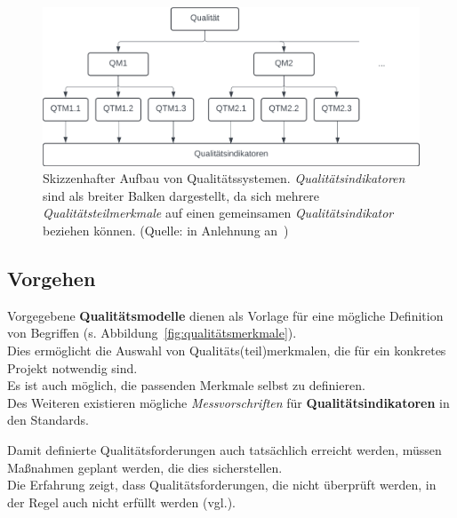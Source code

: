 \begin{figure}
    \centering
    \includegraphics[scale=0.8]{part four/Qualität/img/qualitätssysteme}
    \caption{Skizzenhafter Aufbau von Qualitätssystemen. \textit{Qualitätsindikatoren} sind als breiter Balken dargestellt, da sich mehrere \textit{Qualitätsteilmerkmale} auf einen gemeinsamen \textit{Qualitätsindikator} beziehen können. (Quelle: in Anlehnung an~\cite[Abb. 1.1, 3]{Wed09c})}
    \label{fig:qualitätssysteme}
\end{figure}


\subsection*{Vorgehen}
Vorgegebene \textbf{Qualitätsmodelle} dienen als Vorlage für eine mögliche Definition von Begriffen (s. Abbildung~\ref{fig:qualitätsmerkmale}).\\
Dies ermöglicht die Auswahl von Qualitäts(teil)merkmalen, die für ein konkretes Projekt notwendig sind.\\
Es ist auch möglich, die passenden Merkmale selbst zu definieren.\\

\noindent
Des Weiteren existieren mögliche \textit{Messvorschriften} für \textbf{Qualitätsindikatoren} in den Standards.

\vspace{2mm}
\begin{tcolorbox}
    Damit definierte Qualitätsforderungen auch tatsächlich erreicht werden, müssen Maßnahmen geplant werden, die dies sicherstellen.\\
    Die Erfahrung zeigt, dass Qualitätsforderungen, die nicht überprüft werden, in der Regel auch nicht erfüllt werden (vgl.\cite[4]{Wed09c}).
\end{tcolorbox}
\vspace{2mm}


